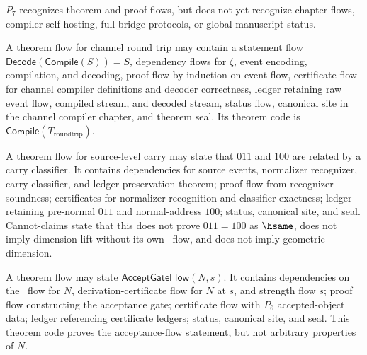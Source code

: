 \begin{corollary}
\label{cor:theorem-proof-p7-not-higher}
$P_7$ recognizes theorem and proof flows, but does not yet recognize chapter flows, compiler self-hosting, full bridge protocols, or global manuscript status.
\end{corollary}

\begin{example}
\label{ex:theorem-proof-channel-roundtrip}
A theorem flow for channel round trip may contain a statement flow $\mathsf{Decode}(\mathsf{Compile}(S))=S$, dependency flows for $\zeta$, event encoding, compilation, and decoding, proof flow by induction on event flow, certificate flow for channel compiler definitions and decoder correctness, ledger retaining raw event flow, compiled stream, and decoded stream, status flow, canonical site in the channel compiler chapter, and theorem seal. Its theorem code is $\mathsf{Compile}(T_{\mathrm{roundtrip}})$.
\end{example}

\begin{example}
\label{ex:theorem-proof-carry-theorem}
A theorem flow for source-level carry may state that $011$ and $100$ are related by a carry classifier. It contains dependencies for source events, normalizer recognizer, carry classifier, and ledger-preservation theorem; proof flow from recognizer soundness; certificates for normalizer recognition and classifier exactness; ledger retaining pre-normal $011$ and normal-address $100$; status, canonical site, and seal. Cannot-claims state that this does not prove $011=100$ as $\hsame$, does not imply dimension-lift without its own \NameCert\ flow, and does not imply geometric dimension.
\end{example}

\begin{example}
\label{ex:theorem-proof-accepted-object-theorem}
A theorem flow may state $\mathsf{AcceptGateFlow}(N,s)$. It contains dependencies on the \NameCert\ flow for $N$, derivation-certificate flow for $N$ at $s$, and strength flow $s$; proof flow constructing the acceptance gate; certificate flow with $P_6$ accepted-object data; ledger referencing certificate ledgers; status, canonical site, and seal. This theorem code proves the acceptance-flow statement, but not arbitrary properties of $N$.
\end{example}

